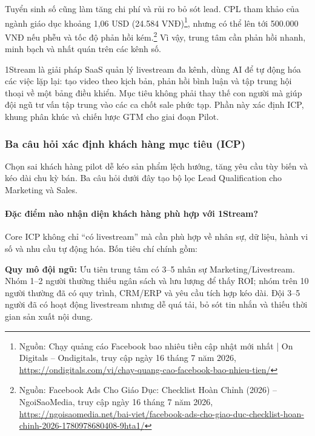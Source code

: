 Tuyển sinh số cũng làm tăng chi phí và rủi ro bỏ sót lead. CPL tham khảo của ngành giáo dục khoảng 1,06 USD (24.584 VNĐ)\footnote{Nguồn: Chạy quảng cáo Facebook bao nhiêu tiền cập nhật mới nhất | On Digitals -- Ondigitals, truy cập ngày 16 tháng 7 năm 2026, \url{https://ondigitals.com/vi/chay-quang-cao-facebook-bao-nhieu-tien/}}, nhưng có thể lên tới 500.000 VNĐ nếu phễu và tốc độ phản hồi kém.\footnote{Nguồn: Facebook Ads Cho Giáo Dục: Checklist Hoàn Chỉnh (2026) -- NgoiSaoMedia, truy cập ngày 16 tháng 7 năm 2026, \url{https://ngoisaomedia.net/bai-viet/facebook-ads-cho-giao-duc-checklist-hoan-chinh-2026-1780978680408-9hta1/}} Vì vậy, trung tâm cần phản hồi nhanh, minh bạch và nhất quán trên các kênh số.

1Stream là giải pháp SaaS quản lý livestream đa kênh, dùng AI để tự động hóa các việc lặp lại: tạo video theo kịch bản, phản hồi bình luận và tập trung hội thoại về một bảng điều khiển. Mục tiêu không phải thay thế con người mà giúp đội ngũ tư vấn tập trung vào các ca chốt sale phức tạp. Phần này xác định ICP, khung phân khúc và chiến lược GTM cho giai đoạn Pilot.

\subsubsection{Ba câu hỏi xác định khách hàng mục tiêu (ICP)}

Chọn sai khách hàng pilot dễ kéo sản phẩm lệch hướng, tăng yêu cầu tùy biến và kéo dài chu kỳ bán. Ba câu hỏi dưới đây tạo bộ lọc Lead Qualification cho Marketing và Sales.

\paragraph{Đặc điểm nào nhận diện khách hàng phù hợp với 1Stream?}

Core ICP không chỉ ``có livestream'' mà cần phù hợp về nhân sự, dữ liệu, hành vi số và nhu cầu tự động hóa. Bốn tiêu chí chính gồm:

\textbf{Quy mô đội ngũ:} Ưu tiên trung tâm có 3--5 nhân sự Marketing/Livestream. Nhóm 1--2 người thường thiếu ngân sách và lưu lượng để thấy ROI; nhóm trên 10 người thường đã có quy trình, CRM/ERP và yêu cầu tích hợp kéo dài. Đội 3--5 người đã có hoạt động livestream nhưng dễ quá tải, bỏ sót tin nhắn và thiếu thời gian sản xuất nội dung.


